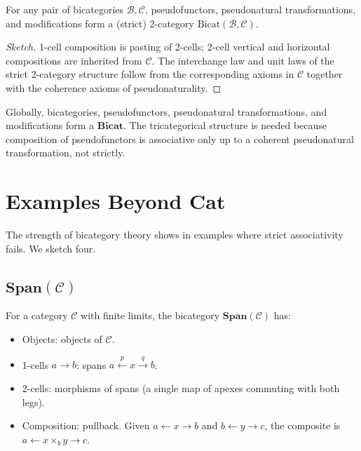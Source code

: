 \begin{proposition}
For any pair of bicategories $\mathcal{B}, \mathcal{C}$, pseudofunctors,
pseudonatural transformations, and modifications form a (strict) 2-category
$\mathrm{Bicat}(\mathcal{B}, \mathcal{C})$.
\end{proposition}

\begin{proof}[Sketch]
1-cell composition is pasting of 2-cells; 2-cell vertical and horizontal
compositions are inherited from $\mathcal{C}$. The interchange law and unit
laws of the strict 2-category structure follow from the corresponding axioms
in $\mathcal{C}$ together with the coherence axioms of pseudonaturality.
\end{proof}

\begin{remark}
Globally, bicategories, pseudofunctors, pseudonatural transformations, and
modifications form a  $\mathbf{Bicat}$. The tricategorical
structure is needed because composition of pseudofunctors is associative only
up to a coherent pseudonatural transformation, not strictly.
\end{remark}


\section{Examples Beyond $\mathbf{Cat}$}
\label{sec:bicat-examples}

The strength of bicategory theory shows in examples where strict associativity
fails. We sketch four.

\subsection{$\mathbf{Span}(\mathcal{C})$}

For a category $\mathcal{C}$ with finite limits, the bicategory
$\mathbf{Span}(\mathcal{C})$ has:
\begin{itemize}
  \item Objects: objects of $\mathcal{C}$.
  \item 1-cells $a \to b$: spans $a \xleftarrow{p} x \xrightarrow{q} b$.
  \item 2-cells: morphisms of spans (a single map of apexes commuting with
        both legs).
  \item Composition: pullback. Given $a \leftarrow x \to b$ and $b \leftarrow
        y \to c$, the composite is $a \leftarrow x \times_b y \to c$.
\end{itemize}

